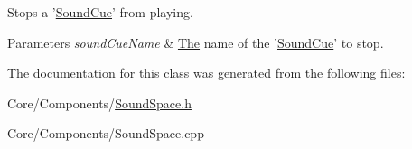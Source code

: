 Stops a '\hyperlink{classDCEngine_1_1SoundCue}{Sound\-Cue}' from playing. 


\begin{DoxyParams}{Parameters}
{\em sound\-Cue\-Name} & \hyperlink{classThe}{The} name of the '\hyperlink{classDCEngine_1_1SoundCue}{Sound\-Cue}' to stop. \\
\hline
\end{DoxyParams}


The documentation for this class was generated from the following files\-:\begin{DoxyCompactItemize}
\item 
Core/\-Components/\hyperlink{SoundSpace_8h}{Sound\-Space.\-h}\item 
Core/\-Components/Sound\-Space.\-cpp\end{DoxyCompactItemize}

